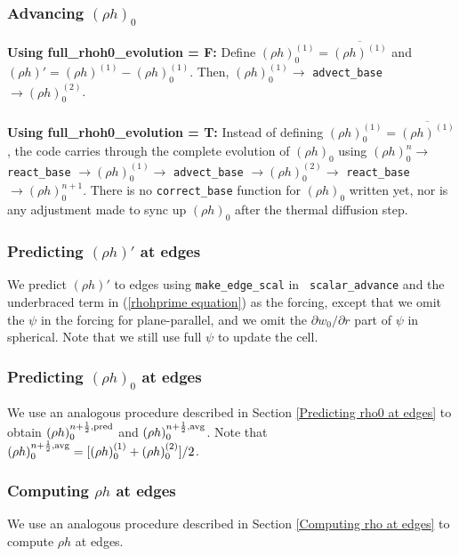 \subsubsection{Advancing $(\rho h)_0$}
{\bf Using full\_rhoh0\_evolution = F:}  Define 
$(\rho h)_0^{(1)} = \overline{(\rho h)^{(1)}}$  
and $(\rho h)' = (\rho h)^{(1)}-(\rho h)_0^{(1)}$.  Then, $(\rho h)_0^{(1)} \rightarrow$ 
{\tt advect\_base} $\rightarrow (\rho h)_0^{(2)}$.\\ \\
{\bf Using full\_rhoh0\_evolution = T:}
 Instead of defining $(\rho h)_0^{(1)} = \overline{(\rho h)^{(1)}}$, the code carries 
through the complete evolution of $(\rho h)_0$ using $(\rho h)_0^n \rightarrow$ {\tt react\_base}
$\rightarrow (\rho h)_0^{(1)} \rightarrow$ {\tt advect\_base}
$\rightarrow (\rho h)_0^{(2)} \rightarrow$ {\tt react\_base} $\rightarrow (\rho h)_0^{n+1}$.  
There is no {\tt correct\_base} function for $(\rho h)_0$ written yet, nor is any 
adjustment made to sync up $(\rho h)_0$ after the thermal diffusion step.

\subsubsection{Predicting $(\rho h)'$ at edges}\label{Predicting rhohprime at edges}
We predict $(\rho h)'$ to edges using {\tt make\_edge\_scal} in {\tt
scalar\_advance} and the underbraced term in (\ref{rhohprime
equation}) as the forcing, except that we omit the $\psi$ in the
forcing for plane-parallel, and we omit the $\partial w_0/\partial r$
part of $\psi$ in spherical.  Note that we still use full $\psi$ to
update the cell.

\subsubsection{Predicting $(\rho h)_0$ at edges}
We use an analogous procedure described in Section \ref{Predicting
rho0 at edges} to obtain $(\rho h)_0^{n+\frac{1}{2},\rm{pred}}$ and $(\rho
h)_0^{n+\frac{1}{2},\rm{avg}}$.  Note that $(\rho h)_0^{n+\frac{1}{2},{\rm avg}} =
[(\rho h)_0^{(1)} + (\rho h)_0^{(2)}]/2$.

\subsubsection{Computing $\rho h$ at edges}
We use an analogous procedure described in Section \ref{Computing rho
at edges} to compute $\rho h$ at edges.

